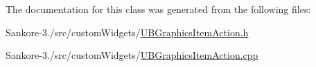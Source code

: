 The documentation for this class was generated from the following files\-:\begin{DoxyCompactItemize}
\item 
Sankore-\/3./src/custom\-Widgets/\hyperlink{_u_b_graphics_item_action_8h}{U\-B\-Graphics\-Item\-Action.\-h}\item 
Sankore-\/3./src/custom\-Widgets/\hyperlink{_u_b_graphics_item_action_8cpp}{U\-B\-Graphics\-Item\-Action.\-cpp}\end{DoxyCompactItemize}
